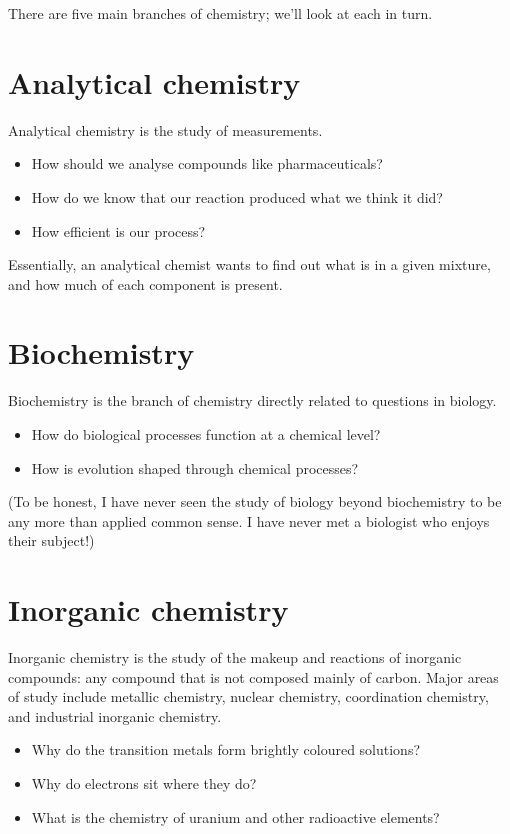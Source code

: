 \documentclass[a4paper]{memoir}
\begin{document}
There are five main branches of chemistry; we'll look at each in turn.

\section{Analytical chemistry}
Analytical chemistry is the study of measurements.
\begin{itemize}
  \item How should we analyse compounds like pharmaceuticals?
  \item How do we know that our reaction produced what we think it did?
  \item How efficient is our process?
\end{itemize}
Essentially, an analytical chemist wants to find out what is in a given mixture, and how much of each component is present.

\section{Biochemistry}
Biochemistry is the branch of chemistry directly related to questions in biology.
\begin{itemize}
  \item How do biological processes function at a chemical level?
  \item How is evolution shaped through chemical processes?
\end{itemize}
(To be honest, I have never seen the study of biology beyond biochemistry to be any more than applied common sense. I have never
met a biologist who enjoys their subject!)

\section{Inorganic chemistry}
Inorganic chemistry is the study of the makeup and reactions of inorganic compounds: any compound that is not composed mainly of carbon. Major
areas of study include metallic chemistry, nuclear chemistry, coordination chemistry, and industrial inorganic chemistry.
\begin{itemize}
  \item Why do the transition metals form brightly coloured solutions?
  \item Why do electrons sit where they do?
  \item What is the chemistry of uranium and other radioactive elements?
\end{itemize}
\end{document}
